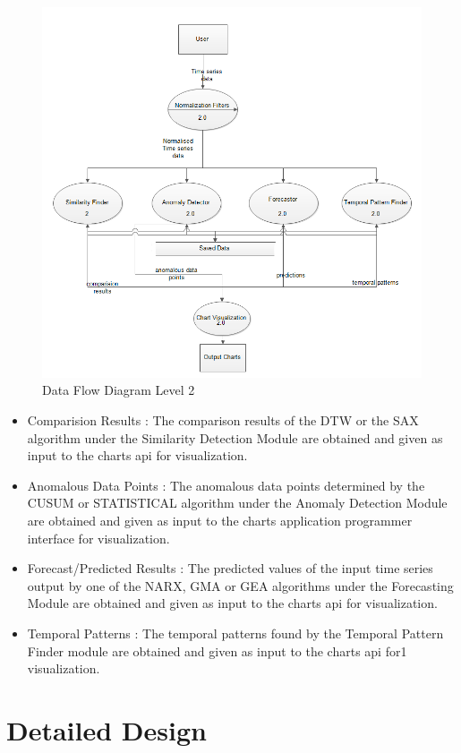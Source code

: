 \documentclass[12pt,a4paper]{report}
\begin{document}
\begin{figure}[h!]
	\centering
		\includegraphics[scale=0.8]{screenshots/dfd_new_2.png}
		\caption{Data Flow Diagram Level 2}
\end{figure}
\begin{itemize}
\item Comparision Results  : The comparison results of the DTW or the SAX algorithm under the Similarity Detection Module are obtained and given as input to the charts api for visualization.
\item Anomalous Data Points  : The anomalous data points determined by the CUSUM or STATISTICAL algorithm under the Anomaly Detection Module are obtained and given as input to the charts application programmer interface for visualization.
\item Forecast/Predicted Results  : The predicted values of the input time series output by one of the NARX, GMA or GEA algorithms under the Forecasting Module are obtained and given as input to the charts api for visualization.
\item Temporal Patterns  : The temporal patterns found by the Temporal Pattern Finder module are obtained and given as input to the charts api for1 visualization.

\end{itemize}
\chapter{Detailed Design}
\pagestyle{fancy}
\chead{}
\rfoot{\small{\thepage}}
\renewcommand{\headrulewidth}{0.4pt}
\renewcommand{\footrulewidth}{0.4pt}
\end{document}
